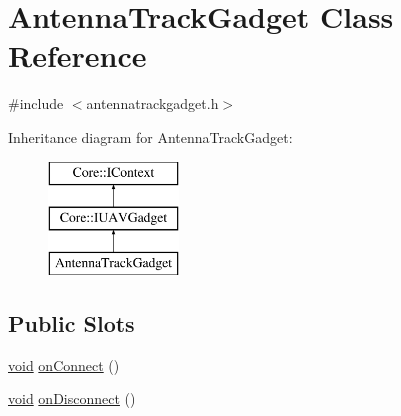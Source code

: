 \hypertarget{class_antenna_track_gadget}{\section{\-Antenna\-Track\-Gadget \-Class \-Reference}
\label{class_antenna_track_gadget}
}


{\ttfamily \#include $<$antennatrackgadget.\-h$>$}

\-Inheritance diagram for \-Antenna\-Track\-Gadget\-:\begin{figure}[H]
\begin{center}
\leavevmode
\includegraphics[height=3.000000cm]{class_antenna_track_gadget}
\end{center}
\end{figure}
\subsection*{\-Public \-Slots}
\begin{DoxyCompactItemize}
\item 
\hyperlink{group___u_a_v_objects_plugin_ga444cf2ff3f0ecbe028adce838d373f5c}{void} \hyperlink{group___antenna_track_gadget_plugin_ga900506724dae73384f80ed883f037588}{on\-Connect} ()
\item 
\hyperlink{group___u_a_v_objects_plugin_ga444cf2ff3f0ecbe028adce838d373f5c}{void} \hyperlink{group___antenna_track_gadget_plugin_ga2732f0141e7e02dc548535a3a87965a6}{on\-Disconnect} ()
\end{DoxyCompactItemize}

